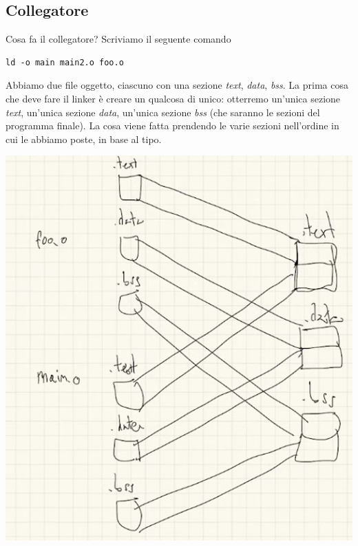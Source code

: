 \documentclass[11pt]{report}
\theoremstyle{definition}
\begin{document}
\subsection{Collegatore}
Cosa fa il collegatore? Scriviamo il seguente comando
\begin{verbatim}
ld -o main main2.o foo.o
\end{verbatim}
Abbiamo due file oggetto, ciascuno con una sezione \emph{text}, \emph{data}, \emph{bss}. La prima cosa che deve fare il linker è creare un qualcosa di unico: otterremo un'unica sezione \emph{text}, un'unica sezione \emph{data}, un'unica sezione \emph{bss} (che saranno le sezioni del programma finale). La cosa viene fatta prendendo le varie sezioni nell'ordine in cui le abbiamo poste, in base al tipo.\begin{center}
\includegraphics[scale=.85]{img/58.PNG}
\end{center}  
\end{document}
